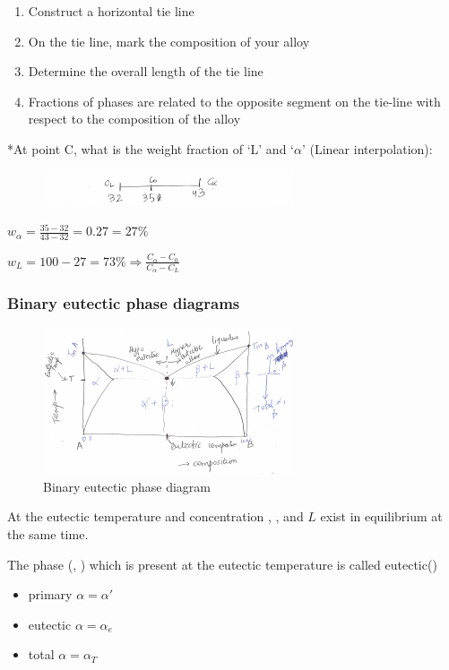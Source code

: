 \documentclass{article}
\begin{document}
\begin{enumerate}
    \item Construct a horizontal tie line
    \item On the tie line, mark the composition of your alloy
    \item Determine the overall length of the tie line
    \item Fractions of phases are related to the opposite segment on the tie-line with respect to the composition of the alloy
\end{enumerate}
*At point C, what is the weight fraction of `L' and `$\alpha$' (Linear interpolation):

\begin{figure}[H]
	\centering
	\includegraphics[width=0.66\textwidth]{assets/ccd151c8.png}
\end{figure}

$w_\alpha = \displaystyle\frac{35-32}{43-32} = 0.27 = 27\%$

$w_L = 100-27=73\% \Rightarrow \frac{C_\alpha-C_0}{C_\alpha-C_L}$

\subsubsection{Binary eutectic phase diagrams}

\begin{figure}[h!]
	\centering
	\includegraphics[width=0.66\textwidth]{assets/89ccf715.png}
	\caption{Binary eutectic phase diagram}
\end{figure}

At the eutectic temperature and concentration \textalpha, \textbeta, and $L$ exist in equilibrium at the same time. 

The phase (\textalpha, \textbeta) which is present at the eutectic temperature is called eutectic(\textalpha\textbeta)
\begin{itemize}
    \item primary $\alpha = \alpha'$
    \item eutectic $\alpha = \alpha_e$
    \item total $\alpha = \alpha_T$
\end{itemize}
\end{document}
